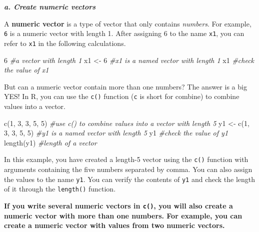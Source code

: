\documentclass[
]{book}
\newenvironment{Shaded}{\begin{snugshade}}{\end{snugshade}}
\newcommand{\CommentTok}[1]{\textcolor[rgb]{0.56,0.35,0.01}{\textit{#1}}}
\newcommand{\DecValTok}[1]{\textcolor[rgb]{0.00,0.00,0.81}{#1}}
\newcommand{\FunctionTok}[1]{\textcolor[rgb]{0.00,0.00,0.00}{#1}}
\newcommand{\NormalTok}[1]{#1}
\newcommand{\OtherTok}[1]{\textcolor[rgb]{0.56,0.35,0.01}{#1}}
\begin{document}
\textbf{\emph{a. Create numeric vectors}}

A \textbf{numeric vector} is a type of vector that only contains \emph{numbers}. For example, \texttt{6} is a numeric vector with length 1. After assigning 6 to the name \texttt{x1}, you can refer to \texttt{x1} in the following calculations.

\begin{Shaded}
\begin{Highlighting}[]
\DecValTok{6}                         \CommentTok{\#a vector with length 1}
\NormalTok{x1 }\OtherTok{\textless{}{-}} \DecValTok{6}                   \CommentTok{\#x1 is a named vector with length 1}
\NormalTok{x1                        }\CommentTok{\#check the value of x1}
\end{Highlighting}
\end{Shaded}

But can a numeric vector contain more than one numbers? The answer is a big YES! In R, you can use the \texttt{c()} function (\texttt{c} is short for combine) to combine values into a vector.

\begin{Shaded}
\begin{Highlighting}[]
\FunctionTok{c}\NormalTok{(}\DecValTok{1}\NormalTok{, }\DecValTok{3}\NormalTok{, }\DecValTok{3}\NormalTok{, }\DecValTok{5}\NormalTok{, }\DecValTok{5}\NormalTok{)          }\CommentTok{\#use c() to combine values into a vector with length 5}
\NormalTok{y1 }\OtherTok{\textless{}{-}} \FunctionTok{c}\NormalTok{(}\DecValTok{1}\NormalTok{, }\DecValTok{3}\NormalTok{, }\DecValTok{3}\NormalTok{, }\DecValTok{5}\NormalTok{, }\DecValTok{5}\NormalTok{)    }\CommentTok{\#y1 is a named vector with length 5}
\NormalTok{y1                        }\CommentTok{\#check the value of y1}
\FunctionTok{length}\NormalTok{(y1)                }\CommentTok{\#length of a vector}
\end{Highlighting}
\end{Shaded}

In this example, you have created a length-5 vector using the \texttt{c()} function with arguments containing the five numbers separated by comma. You can also assign the values to the name \texttt{y1}. You can verify the contents of \texttt{y1} and check the length of it through the \texttt{length()} function.

\textbf{If you write several numeric vectors in \texttt{c()}, you will also create a numeric vector with more than one numbers. For example, you can create a numeric vector with values from two numeric vectors.}
\end{document}
